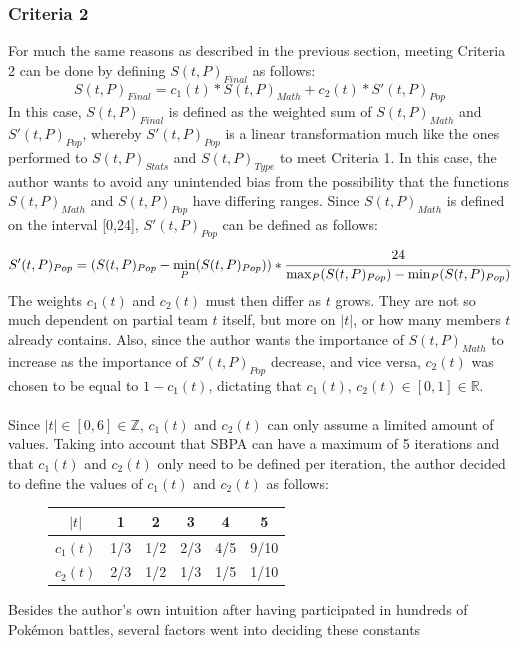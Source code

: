\documentclass{article}
\begin{document}
\subsubsection{Criteria 2}
For much the same reasons as described in the previous section, meeting Criteria 2 can be done by defining $S(t,P)_{Final}$ as follows:
\begin{equation*}
	S(t,P)_{Final}=c_1(t)*S(t,P)_{Math}+c_2(t)*S'(t,P)_{Pop}
\end{equation*}
In this case, $S(t,P)_{Final}$ is defined as the weighted sum of $S(t,P)_{Math}$ and $S'(t,P)_{Pop}$, whereby $S'(t,P)_{Pop}$ is a linear transformation much like the ones performed to $S(t,P)_{Stats}$ and $S(t,P)_{Type}$ to meet Criteria 1. In this case, the author wants to avoid any unintended bias from the possibility that the functions $S(t,P)_{Math}$ and $S(t,P)_{Pop}$ have differing ranges. Since $S(t,P)_{Math}$ is defined on the interval [0,24], $S'(t,P)_{Pop}$ can be defined as follows:
\begin{equation*}
	S'(t,P)_{Pop}=(S(t,P)_{Pop}-\min_P(S(t,P)_{Pop}))*\cfrac{24}{\max_P(S(t,P)_{Pop})-\min_P(S(t,P)_{Pop})}
\end{equation*}
The weights $c_1(t)$ and $c_2(t)$ must then differ as $t$ grows. They are not so much dependent on partial team $t$ itself, but more on $|t|$, or how many members $t$ already contains. Also, since the author wants the importance of $S(t,P)_{Math}$ to increase as the importance of $S'(t,P)_{Pop}$ decrease, and vice versa, $c_2(t)$ was chosen to be equal to $1-c_1(t)$, dictating that $c_1(t)\text{, }c_2(t)\in[0,1]\in\mathbb{R}$.\\\\
Since $|t|\in [0,6]\in\mathbb{Z}$, $c_1(t)$ and $c_2(t)$ can only assume a limited amount of values. Taking into account that SBPA can have a maximum of 5 iterations and that $c_1(t)$ and $c_2(t)$ only need to be defined per iteration, the author decided to define the values of $c_1(t)$ and $c_2(t)$ as follows:
\begin{figure}[H]
	\begin{tabular}{c||c|c|c|c|c}
		$|t|$&1&2&3&4&5\\
		\hline
		$c_1(t)$&1/3&1/2&2/3&4/5&9/10\\
		$c_2(t)$&2/3&1/2&1/3&1/5&1/10
	\end{tabular}
	\centering
\end{figure}
Besides the author's own intuition after having participated in hundreds of Pok\'emon battles, several factors went into deciding these constants
\end{document}
